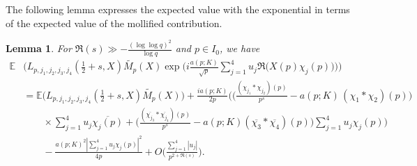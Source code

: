 \documentclass[12pt, reqno]{amsart}
\newcommand{\E}{\mathbb{E}}
\newtheorem{lemma}[theorem]{Lemma}
\numberwithin{equation}{section}
\numberwithin{theorem}{section}
\numberwithin{equation}{section}
\begin{document}
The following lemma expresses the expected value with the exponential in terms of the expected value of the mollified contribution.

\begin{lemma}
\label{smallprime}
   For $\Re(s) \gg - \frac{ (\log \log q)^2}{\log q}$ and $p \in I_0$, we have 
    \begin{align*}
        \E & \Bigg(L_{p,j_1,j_2,j_3,j_4}( \tfrac{1}{2}+s,X) \widetilde{M_p}(X) \exp \bigg(  i \frac{a(p;K)}{
    \sqrt{p}}\sum_{j=1}^4   u_j \Re \big(X(p) \chi_j(p)\big)\bigg) \Bigg) \\
    & =  \E \Big(L_{p,j_1,j_2,j_3,j_4}( \tfrac{1}{2}+s,X) \widetilde{M_p}(X) \Big) +\frac{ia(p;K)}{2p} \bigg( \Big(\frac{(\chi_{j_1}*\chi_{j_2})(p)}{p^{s}}- a(p;K)\,(\chi_1*\chi_2)(p) \Big) \\
    &\qquad\times \sum_{j=1}^4 u_j \overline{\chi_j(p)}+\Big(  \frac{(\overline{\chi_{j_3}}*\overline{\chi_{j_4}})(p)}{p^{s}} - a(p;K)(\overline{\chi_3}*\overline{\chi_4})(p)\Big)\sum_{j=1}^4 u_j \chi_j(p)\bigg)\\
    &\qquad- \frac{a(p;K)^2 |\sum_{j=1}^4 u_j \chi_j(p)|^2}{4p}+ O \Big(  \frac{\sum_{j=1}^4 |u_j|}{p^{2+\Re(s)}}\Big).
    \end{align*}
\end{lemma}
\end{document}
